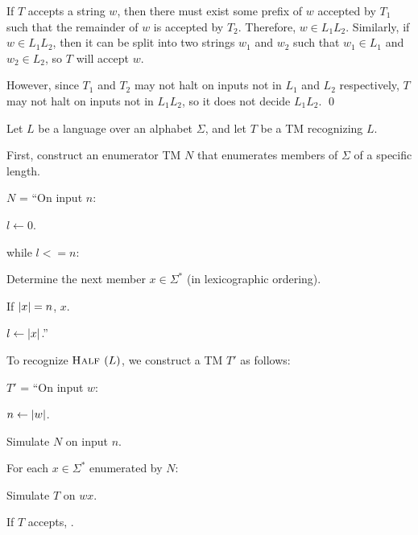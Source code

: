 \begin{problem}
\begin{enumalph}
\begin{Answer}
        \step
        If $T$ accepts a string $w$, then there must exist some prefix of $w$
        accepted by $T_1$ such that the remainder of $w$ is accepted by $T_2$.
        Therefore, $w \in L_1 L_2$.
        Similarly, if $w \in L_1 L_2$, then it can be split into two strings
        $w_1$ and $w_2$ such that $w_1 \in L_1$ and $w_2 \in L_2$,
        so $T$ will accept $w$.

        However, since $T_1$ and $T_2$ may not halt on inputs not in $L_1$
        and $L_2$ respectively, $T$ may not halt on inputs not in $L_1 L_2$,
        so it does not decide $L_1 L_2$.  \qed
    \end{Answer}

    \newpage
    \setcounter{enumi}{4}
    \item \half
    \begin{Answer}
      Let $L$ be a language over an alphabet $\Sigma$,
      and let $T$ be a TM recognizing $L$.

      \step
      First, construct an enumerator TM
      $N$ that enumerates members of $\Sigma$ of a specific length.

      \step
      $N$ = ``On input $n$:
        \begin{enumarabic}
          \item $l \gets 0$.
          \item while $l <= n$:
            \begin{enumarabic*}
              \item Determine the next member $x \in \Sigma^*$ (in lexicographic ordering).
              \item If $\lvert x\rvert = n$, \List $x$.
              \item $l \gets \lvert x\rvert$.''
            \end{enumarabic*}
        \end{enumarabic}

      \step
      To recognize $\textsc{Half }(L)$, we construct a TM $T'$ as follows:

      \step
      $T'$ = ``On input $w$:
        \begin{enumarabic}
          \item $n \gets \lvert w\rvert$.
          \item Simulate $N$ on input $n$.
          \item For each $x \in \Sigma^*$ enumerated by $N$:
            \begin{enumarabic*}
              \item Simulate $T$ on $wx$.
              \item If $T$ accepts, \Accept.
            \end{enumarabic*}
        \end{enumarabic}
    \end{Answer}
  \end{enumalph}
\end{problem}
